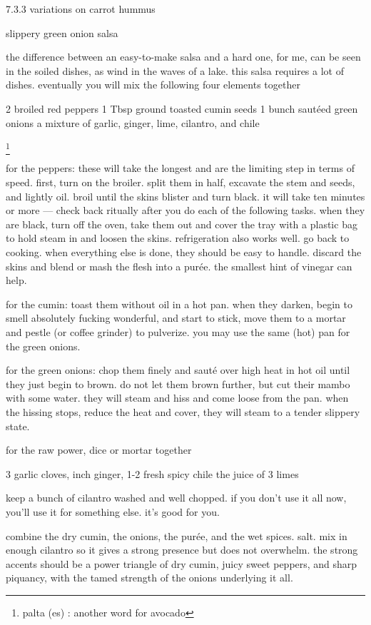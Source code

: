 7.3.3  variations on carrot hummus

slippery green onion salsa

the difference between an easy-to-make salsa and a hard one, for me, can be seen in the soiled dishes, as wind in the waves of a lake. this salsa requires a lot of dishes. eventually you will mix the following four elements together

2 broiled red peppers
1 Tbsp ground toasted cumin seeds
1 bunch saut\'{e}ed green onions
a mixture of garlic, ginger, lime, cilantro, and chile

\footnote{palta (es) : another word for avocado}

for the peppers:
	these will take the longest and are the limiting step in terms of speed. first, turn on the broiler. split them in half, excavate the stem and seeds, and lightly oil. broil until the skins blister and turn black. it will take ten minutes or more --- check back ritually after you do each of the following tasks. when they are black, turn off the oven, take them out and cover the tray with a plastic bag to hold steam in and loosen the skins. refrigeration also works well. go back to cooking. when everything else is done, they should be easy to handle. discard the skins and blend or mash the flesh into a pur\'{e}e. the smallest hint of vinegar can help.

for the cumin:
	toast them without oil in a hot pan. when they darken, begin to smell absolutely fucking wonderful, and start to stick, move them to a mortar and pestle (or coffee grinder) to pulverize. you may use the same (hot) pan for the green onions.

for the green onions:
	chop them finely and saut\'{e} over high heat in hot oil until they just begin to brown. do not let them brown further, but cut their mambo with some water. they will steam and hiss and come loose from the pan. when the hissing stops, reduce the heat and cover, they will steam to a tender slippery state.

for the raw power, dice or mortar together

	3 garlic cloves,
	\onehalf inch ginger,
	1-2 fresh spicy chile
	the juice of 3 limes

	keep a bunch of cilantro washed and well chopped. if you don't use it all now, you'll use it for something else. it's good for you.

combine the dry cumin, the onions, the pur\'{e}e, and the wet spices. salt. mix in enough cilantro so it gives a strong presence but does not overwhelm. the strong accents should be a power triangle of dry cumin, juicy sweet peppers, and sharp piquancy, with the tamed strength of the onions underlying it all.

